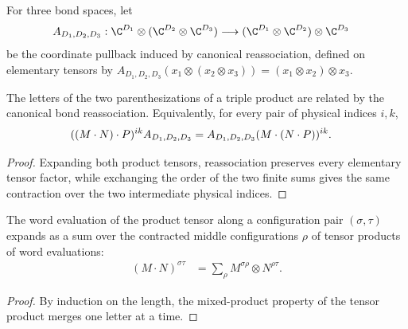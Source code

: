 \begin{definition}%
    \label{def:mpdo_operator_product_associator}
    \leanok
    For three bond spaces, let
    \begin{align}
        A_{D_1,D_2,D_3}:
        \C^{D_1}\otimes(\C^{D_2}\otimes\C^{D_3})
         & \longrightarrow
        (\C^{D_1}\otimes\C^{D_2})\otimes\C^{D_3}
        \notag
    \end{align}
    be the coordinate pullback induced by canonical reassociation, defined on
    elementary tensors by
    $A_{D_1,D_2,D_3}(x_1\otimes(x_2\otimes x_3))
        =(x_1\otimes x_2)\otimes x_3$.
\end{definition}

\begin{lemma}%
    \label{thm:mpdo_operator_product_associativity}
    \leanok
    The letters of the two parenthesizations of a triple product are related
    by the canonical bond reassociation. Equivalently, for every pair of
    physical indices $i,k$,
    \begin{align}
        ((M\mathbin{\cdot}N)\mathbin{\cdot}P)^{ik}
        A_{D_1,D_2,D_3}
         & =A_{D_1,D_2,D_3}
        (M\mathbin{\cdot}(N\mathbin{\cdot}P))^{ik}.
        \notag
    \end{align}
\end{lemma}
\begin{proof}\leanok
    Expanding both product tensors, reassociation preserves every elementary
    tensor factor, while exchanging the order of the two finite sums gives
    the same contraction over the two intermediate physical indices.
\end{proof}

\begin{lemma}%
    \label{lem:mpdo_operator_product_eval_word}
    \leanok
    The word evaluation of the product tensor along a configuration pair
    $(\sigma,\tau)$ expands as a sum over the contracted middle
    configurations $\rho$ of tensor products of word evaluations:
    \begin{align}
        (M\mathbin{\cdot}N)^{\sigma\tau}
         & =\sum_\rho M^{\sigma\rho}\otimes N^{\rho\tau}.
        \label{eq:rfp_product_word}
    \end{align}
\end{lemma}
\begin{proof}\leanok
    By induction on the length, the mixed-product property of the tensor
    product merges one letter at a time.
\end{proof}

